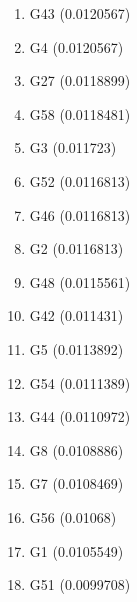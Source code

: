 \begin{enumerate}
\item G43 (0.0120567)
\item G4 (0.0120567)
\item G27 (0.0118899)
\item G58 (0.0118481)
\item G3 (0.011723)
\item G52 (0.0116813)
\item G46 (0.0116813)
\item G2 (0.0116813)
\item G48 (0.0115561)
\item G42 (0.011431)
\item G5 (0.0113892)
\item G54 (0.0111389)
\item G44 (0.0110972)
\item G8 (0.0108886)
\item G7 (0.0108469)
\item G56 (0.01068)
\item G1 (0.0105549)
\item G51 (0.0099708)
\end{enumerate}
